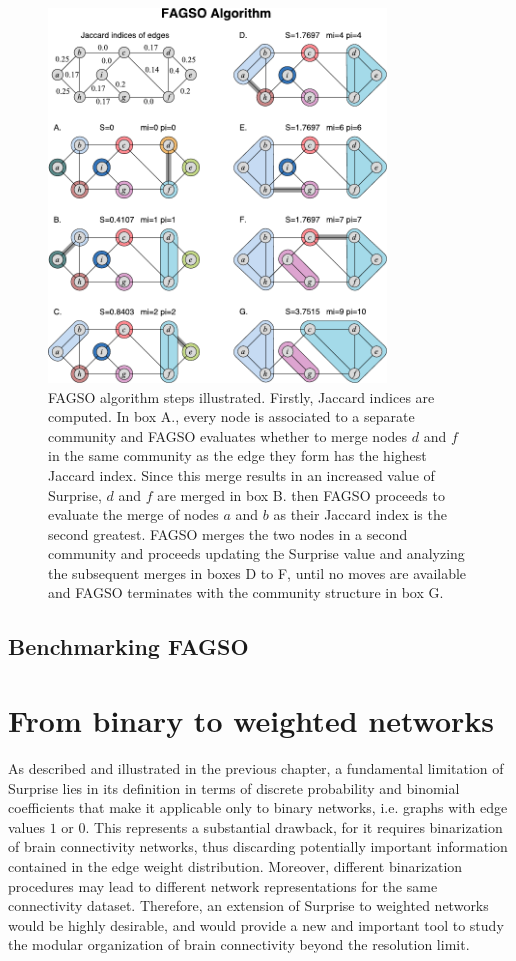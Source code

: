 \begin{figure}[htb!]
\centering
\includegraphics[width=0.8\textwidth]{images/fagso.pdf}
\caption{FAGSO algorithm steps illustrated. Firstly, Jaccard indices are computed. In box A., every node is associated to a separate community and FAGSO evaluates whether to merge nodes $d$ and $f$ in the same community as the edge they form has the highest Jaccard index. Since this merge results in an increased value of Surprise, $d$ and $f$ are merged in box B. then FAGSO proceeds to evaluate the merge of nodes $a$ and $b$ as their Jaccard index is the second greatest. FAGSO merges the two nodes in a second community and proceeds updating the Surprise value and analyzing the subsequent merges in boxes D to F, until no moves are available and FAGSO terminates with the community structure in box G.}
\label{fig:fagso_working}
\end{figure}

\subsection{Benchmarking FAGSO}


\section{From binary to weighted networks}
As described and illustrated in the previous chapter, a fundamental limitation of Surprise lies in its definition in terms of discrete probability and binomial coefficients that make it applicable only to binary networks, i.e. graphs with edge values $1$ or $0$.
This represents a substantial drawback, for it requires binarization of brain connectivity networks, thus discarding potentially important information contained in the edge weight distribution.
Moreover, different binarization procedures may lead to different network representations for the same connectivity dataset.
Therefore, an extension of Surprise to weighted networks would be highly desirable, and would provide a new and important tool to study the modular organization of brain connectivity beyond the resolution limit.


